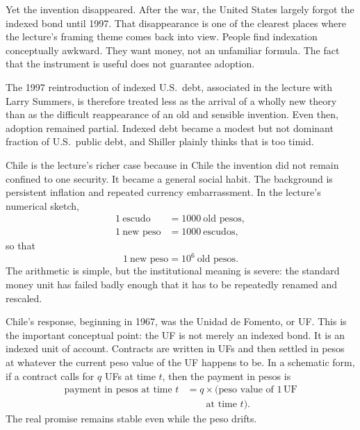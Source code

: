 Yet the invention disappeared. After the war, the United States largely forgot the indexed bond until 1997. That disappearance is one of the clearest places where the lecture's framing theme comes back into view. People find indexation conceptually awkward. They want money, not an unfamiliar formula. The fact that the instrument is useful does not guarantee adoption.

The 1997 reintroduction of indexed U.S.\ debt, associated in the lecture with Larry Summers, is therefore treated less as the arrival of a wholly new theory than as the difficult reappearance of an old and sensible invention. Even then, adoption remained partial. Indexed debt became a modest but not dominant fraction of U.S.\ public debt, and Shiller plainly thinks that is too timid.

Chile is the lecture's richer case because in Chile the invention did not remain confined to one security. It became a general social habit. The background is persistent inflation and repeated currency embarrassment. In the lecture's numerical sketch,
\begin{align}
1\ \text{escudo} &= 1000\ \text{old pesos},\\
1\ \text{new peso} &= 1000\ \text{escudos},
\end{align}
so that
\begin{equation}
1\ \text{new peso}=10^6\ \text{old pesos}.
\end{equation}
The arithmetic is simple, but the institutional meaning is severe: the standard money unit has failed badly enough that it has to be repeatedly renamed and rescaled.

Chile's response, beginning in 1967, was the Unidad de Fomento, or UF. This is the important conceptual point: the UF is not merely an indexed bond. It is an indexed unit of account. Contracts are written in UFs and then settled in pesos at whatever the current peso value of the UF happens to be. In a schematic form, if a contract calls for $q$ UFs at time $t$, then the payment in pesos is
\begin{equation}
\begin{aligned}
\text{payment in pesos at time } t
&= q \times (\text{peso value of }1\,\mathrm{UF} \\
&\qquad \text{at time } t).
\end{aligned}
\end{equation}
The real promise remains stable even while the peso drifts.

